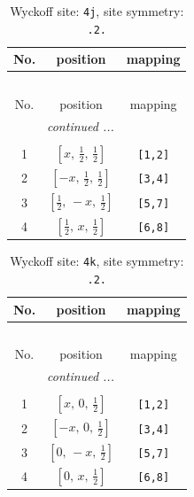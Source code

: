 \documentclass[fleqn,8pt]{jsarticle}
\begin{document}
\begin{longtable}{ccc}
\caption{Wyckoff site: {\tt 4j}, site symmetry: {\tt .2.}}
 \\
 \hline \hline
No. & position & mapping \\ \hline \endfirsthead

\multicolumn{2}{l}{\tablename\ \thetable{}} \\
 \hline \hline
No. & position & mapping \\ \hline \endhead

 \hline \hline
\multicolumn{2}{r}{\footnotesize\it continued ...} \\ \endfoot

 \hline \hline
\multicolumn{2}{r}{} \\ \endlastfoot

1 & $\left[ x,\, \frac{1}{2},\, \frac{1}{2} \right]$ & {\tt [1,2]} \\ \hline
2 & $\left[ - x,\, \frac{1}{2},\, \frac{1}{2} \right]$ & {\tt [3,4]} \\ \hline
3 & $\left[ \frac{1}{2},\, - x,\, \frac{1}{2} \right]$ & {\tt [5,7]} \\ \hline
4 & $\left[ \frac{1}{2},\, x,\, \frac{1}{2} \right]$ & {\tt [6,8]} \\
\end{longtable}
\renewcommand{\arraystretch}{1.2}
\begin{longtable}{ccc}
\caption{Wyckoff site: {\tt 4k}, site symmetry: {\tt .2.}}
 \\
 \hline \hline
No. & position & mapping \\ \hline \endfirsthead

\multicolumn{2}{l}{\tablename\ \thetable{}} \\
 \hline \hline
No. & position & mapping \\ \hline \endhead

 \hline \hline
\multicolumn{2}{r}{\footnotesize\it continued ...} \\ \endfoot

 \hline \hline
\multicolumn{2}{r}{} \\ \endlastfoot

1 & $\left[ x,\, 0,\, \frac{1}{2} \right]$ & {\tt [1,2]} \\ \hline
2 & $\left[ - x,\, 0,\, \frac{1}{2} \right]$ & {\tt [3,4]} \\ \hline
3 & $\left[ 0,\, - x,\, \frac{1}{2} \right]$ & {\tt [5,7]} \\ \hline
4 & $\left[ 0,\, x,\, \frac{1}{2} \right]$ & {\tt [6,8]} \\
\end{longtable}
\end{document}

